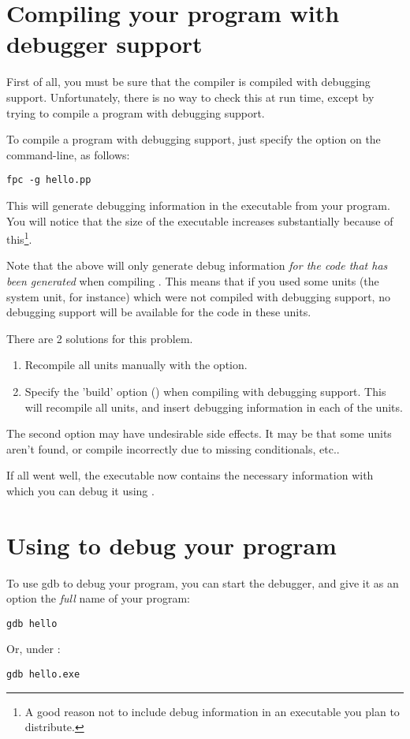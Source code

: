 \section{Compiling your program with debugger support}
First of all, you must be sure that the compiler is compiled with debugging
support. Unfortunately, there is no way to check this at run time, except by
trying to compile a program with debugging support.

To compile a program with debugging support, just specify the 
option on the command-line, as follows:
\begin{verbatim}
fpc -g hello.pp
\end{verbatim}
This will generate debugging information in the executable from your
program. You will notice that the size of the executable increases
substantially because of this\footnote{A good reason not to include debug
information in an executable you plan to distribute.}.

Note that the above will only generate debug information {\em for the code
that has been generated} when compiling . This means that if
you used some units (the system unit, for instance) which were not compiled
with debugging support, no debugging support will be available for the code
in these units.

There are 2 solutions for this problem.
\begin{enumerate}
\item Recompile all units manually with the  option.
\item Specify the 'build' option () when compiling with debugging
support. This will recompile all units, and insert debugging information in
each of the units.
\end{enumerate}
The second option may have undesirable side effects. It may be that some
units aren't found, or compile incorrectly due to missing conditionals,
etc..

If all went well, the executable now contains the necessary information with
which you can debug it using \gnu {}.


\section{Using  to debug your program}
\label{se:usinggdb}

To use gdb to debug your program, you can start the debugger, and give it as
an option the {\em full} name of your program:
\begin{verbatim}
gdb hello
\end{verbatim}
Or, under \dos :
\begin{verbatim}
gdb hello.exe
\end{verbatim}

